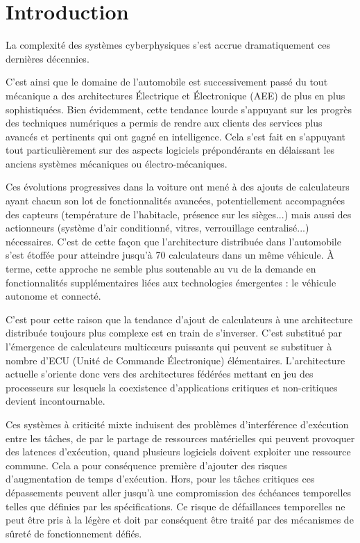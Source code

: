 \documentclass[french, a4paper, 11pt, twoside, pdftex]{StyleThese}
\begin{document}
\fi


\chapter*{Introduction}

La complexité des systèmes cyberphysiques s’est accrue dramatiquement  ces dernières décennies. 

C'est ainsi que le domaine de l'automobile est successivement passé du tout mécanique a des architectures Électrique et Électronique (AEE) de plus en plus sophistiquées. Bien évidemment, cette tendance lourde s’appuyant sur les progrès des techniques numériques a permis de rendre aux clients des services plus avancés et pertinents qui ont gagné en intelligence. Cela s'est fait en s’appuyant tout particulièrement sur des aspects logiciels prépondérants en délaissant les anciens systèmes mécaniques ou électro-mécaniques.

Ces évolutions progressives dans la voiture ont mené à des ajouts de calculateurs ayant chacun son lot de fonctionnalités avancées, potentiellement accompagnées des capteurs (température de l'habitacle, présence sur les sièges...) mais aussi des actionneurs (système d'air conditionné, vitres, verrouillage centralisé...) nécessaires.
C'est de cette façon que l'architecture distribuée dans l'automobile s'est étoffée pour atteindre jusqu'à 70 calculateurs dans un même véhicule. À terme, cette approche ne semble plus soutenable au vu de la demande en fonctionnalités supplémentaires liées aux technologies émergentes : le véhicule autonome et connecté.

C’est pour cette raison que la tendance d'ajout de calculateurs à une architecture distribuée toujours plus complexe est en train de s’inverser. C'est substitué par l’émergence de calculateurs multicœurs puissants qui peuvent se substituer à nombre d’ECU (Unité de Commande Électronique) élémentaires. L’architecture actuelle s’oriente donc vers des architectures fédérées mettant en jeu des processeurs sur lesquels la coexistence d’applications critiques et non-critiques devient incontournable. 

Ces systèmes à criticité mixte induisent des problèmes d'interférence d'exécution entre les tâches, de par le partage de ressources matérielles qui peuvent provoquer des latences d'exécution, quand plusieurs logiciels doivent exploiter une ressource commune. Cela a pour conséquence première d'ajouter des risques d'augmentation de temps d'exécution. Hors, pour les tâches critiques ces dépassements peuvent aller jusqu'à une compromission des échéances temporelles telles que définies par les spécifications. Ce risque de défaillances temporelles ne peut être pris à la légère et doit par conséquent être traité par des mécanismes de sûreté de fonctionnement défiés.
\end{document}
